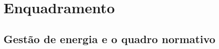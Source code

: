 
\chapter{Enquadramento}
\label{cha:enquadramento}

\section{Gestão de energia e o quadro normativo}
\label{sec:normas}

